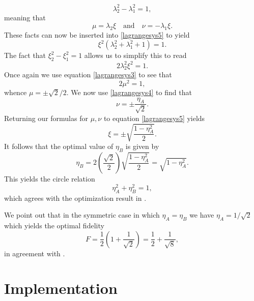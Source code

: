 \documentclass[reqno]{amsart}
\numberwithin{lemma}{section}
\numberwithin{proposition}{section}
\begin{document}
\begin{equation*}
	\lambda_{2}^{2} - \lambda_{1}^{2} = 1,
\end{equation*}
meaning that
\begin{equation*}
	\mu = \lambda_{2} \xi \quad \text{and} \quad \nu = - \lambda_{1} \xi.
\end{equation*}
These facts can now be inserted into \eqref{lagrangesys5} to yield
\begin{equation*}
	\xi^{2}(\lambda_{2}^{2} + \lambda_{1}^{2} + 1) = 1.
\end{equation*}
The fact that $\xi_{2}^{2} - \xi_{1}^{2} = 1$ allows us to simplify this to read
\begin{equation*}
	2 \lambda_{2}^{2} \xi^{2} = 1.
\end{equation*}
Once again we use equation \eqref{lagrangesys3} to see that
\begin{equation*}
	2 \mu^{2} = 1,
\end{equation*}
whence $\mu = \pm \sqrt{2}/2$. We now use \eqref{lagrangesys4} to find that
\begin{equation*}
	\nu = \pm \frac{\eta_{A}}{\sqrt{2}}.
\end{equation*}
Returning our formulas for $\mu, \nu$ to equation \eqref{lagrangesys5} yields
\begin{equation*}
	\xi = \pm \sqrt{\frac{1 - \eta_{A}^{2}}{2}}.
\end{equation*}
It follows that the optimal value of $\eta_{B}$ is given by
\begin{equation*}
	\eta_{B} = 2 \left ( \frac{\sqrt{2}}{2}\right )\sqrt{\frac{1 - \eta_{A}^{2}}{2}} = \sqrt{1 - \eta_{A}^{2}}.
\end{equation*}
This yields the circle relation
\begin{equation*}
\eta_{A}^{2} + \eta_{B}^{2} = 1,
\end{equation*}
which agrees with the optimization result in \cite{REZAKHANI2005278}. 

We point out that in the symmetric case in which $\eta_{A} = \eta_{B}$ we have $\eta_{A} = 1/\sqrt{2}$ which yields the optimal fidelity
\begin{equation*}
	F = \frac{1}{2}\left ( 1 + \frac{1}{\sqrt{2}} \right ) = \frac{1}{2} + \frac{1}{\sqrt{8}},
\end{equation*}
in agreement with \cite{PhysRevA.65.012304}.



\section{Implementation}
\end{document}
